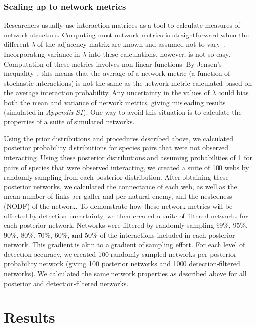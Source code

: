 \documentclass[12pt]{article}
\begin{document}
\begin{spacing}{2.0}
    \subsubsection*{Scaling up to network metrics}

      Researchers usually use interaction matrices as a tool to calculate measures of network structure. Computing most network metrics is straightforward when the different $\lambda$ of the adjacency matrix are known and assumed not to vary~\citep{Poisot2016}. Incorporating variance in $\lambda$ into these calculations, however, is not so easy. Computation of these metrics involves non-linear functions. By Jensen's inequality~\citep{Jensen1906}, this means that the average of a network metric (a function of stochastic interactions) is not the same as the network metric calculated based on the average interaction probability. Any uncertainty in the values of $\lambda$ could bias both the mean and variance of network metrics, giving misleading results (simulated in \emph{Appendix S1}). One way to avoid this situation is to calculate the properties of a suite of simulated networks.


      Using the prior distributions and procedures described above, we calculated posterior probability distributions for species pairs that were not observed interacting. Using these posterior distributions and assuming probabilities of 1 for pairs of species that were observed interacting, we created a suite of 100 webs by randomly sampling from each posterior distribution. After obtaining these posterior networks, we calculated the connectance of each web, as well as the mean number of links per galler and per natural enemy, and the nestedness (NODF) of the network. To demonstrate how these network metrics will be affected by detection uncertainty, we then created a suite of filtered networks for each posterior network. Networks were filtered by randomly sampling 99\%, 95\%, 90\%, 80\%, 70\%, 60\%, and 50\% of the interactions included in each posterior network. This gradient is akin to a gradient of sampling effort. For each level of detection accuracy, we created 100 randomly-sampled networks per posterior-probability network (giving 100 posterior networks and 1000 detection-filtered networks). We calculated the same network properties as described above for all posterior and detection-filtered networks.


\section*{Results}


\end{spacing}
\end{document}
